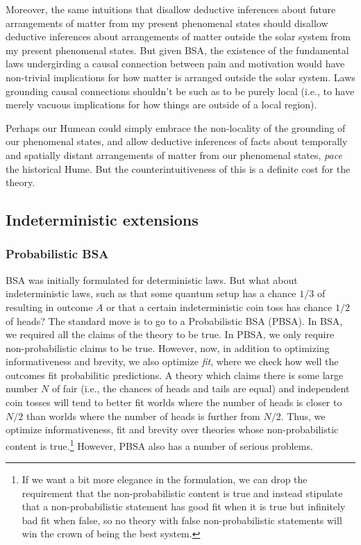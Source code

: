 Moreover, the same intuitions that disallow deductive inferences about future arrangements of matter from my present
phenomenal states should disallow deductive inferences about arrangements of matter outside the solar system from my present
phenomenal states. But given BSA, the existence of the fundamental laws undergirding a causal connection between 
pain and motivation would have non-trivial implications for how matter is arranged outside the solar system. Laws grounding 
causal connections shouldn't be such as to be purely local (i.e., to have merely vacuous implications for how things are outside
of a local region). 

Perhaps our Humean could simply embrace the non-locality of the grounding of our phenomenal states, and allow deductive inferences
of facts about temporally and spatially distant arrangements of matter from our phenomenal states, \textit{pace} the historical Hume.
But the counterintuitiveness of this is a definite cost for the theory.

\subsection{Indeterministic extensions}
\subsubsection{Probabilistic BSA}
BSA was initially formulated for deterministic laws. But what about indeterministic laws, such as that some quantum setup has a
chance $1/3$ of resulting in outcome $A$ or that a certain indeterministic coin toss has chance $1/2$
of heads? The standard move is to go to a Probabilistic BSA (PBSA). In BSA, we required all the claims of the theory to be true.
In PBSA, we only require non-probabilistic claims to be true. However, now, in addition to optimizing informativeness and 
brevity, we also optimize \textit{fit}, where we check how well the outcomes fit probabilitic predictions. A theory which claims 
there is some large number $N$ of fair (i.e., the chances of heads and tails are equal) and independent  
coin tosses will tend to better fit worlds where the number of heads is closer to $N/2$ than worlds where the number of heads is 
further from $N/2$. Thus, we optimize informativeness, fit and brevity over theories whose non-probabilistic content is true.\footnote{If we 
want a bit more elegance in the formulation, we can drop the requirement that the non-probabilistic content is true and instead
stipulate that a non-probabilistic statement has good fit when it is true but infinitely bad fit when false, so no theory with false
non-probabilistic statements will win the crown of being the best system.} However, PBSA also has a number of serious
problems.

